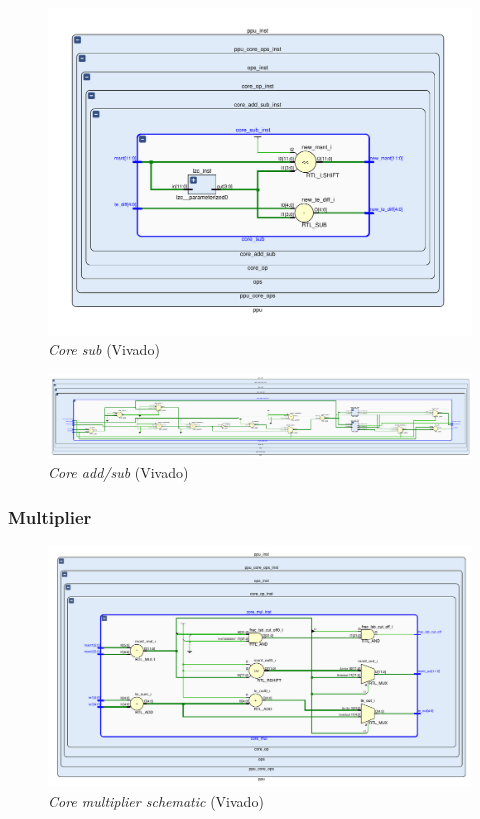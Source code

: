 \begin{figure}
    \centering
    \includegraphics[width=1\textwidth]{figures/core_sub_vivado.pdf}
    \caption{\textit{Core sub} (Vivado)}
    \label{fig:core_sub_vivado}
\end{figure}

\begin{figure}
    \centering
    \includegraphics[width=1\textwidth]{figures/core_add_sub_vivado.pdf}
    \caption{\textit{Core add/sub} (Vivado)}
    \label{fig:core_add_sub_vivado}
\end{figure}%




\subsubsection{Multiplier}

\begin{figure}
    \centering
    \includegraphics[width=\textwidth]{figures/mul_vivado.pdf}
    \caption{\textit{Core multiplier schematic} (Vivado)}
    \label{fig:mul_vivado}
\end{figure}


